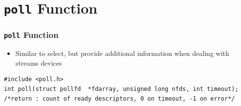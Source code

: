 \documentclass[notes,serif]{beamer}
\begin{document}
\section{\texttt{poll} Function}
\begin{frame}[containsverbatim]
\frametitle{\texttt{poll} Function}
\begin{itemize}
  \item Similar to select, but provide additional information when dealing with streams devices
\end{itemize}
{\scriptsize
\begin{verbatim}
#include <poll.h>
int poll(struct pollfd  *fdarray, unsigned long nfds, int timeout);
/*return : count of ready descriptors, 0 on timeout, -1 on error*/
\end{verbatim}
}
\end{frame}
\end{document}
